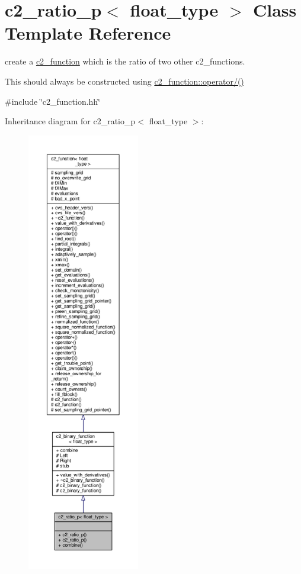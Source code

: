 \hypertarget{classc2__ratio__p}{}\section{c2\+\_\+ratio\+\_\+p$<$ float\+\_\+type $>$ Class Template Reference}
\label{classc2__ratio__p}


create a \hyperlink{classc2__function}{c2\+\_\+function} which is the ratio of two other c2\+\_\+functions.

This should always be constructed using \hyperlink{classc2__function_a93ac28dfe5daebea84d147b8e346e60c}{c2\+\_\+function\+::operator/()}  




{\ttfamily \#include \char`\"{}c2\+\_\+function.\+hh\char`\"{}}



Inheritance diagram for c2\+\_\+ratio\+\_\+p$<$ float\+\_\+type $>$\+:
\nopagebreak
\begin{figure}[H]
\begin{center}
\leavevmode
\includegraphics[height=550pt]{classc2__ratio__p__inherit__graph}
\end{center}
\end{figure}


